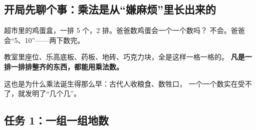 \subsection{开局先聊个事：乘法是从“嫌麻烦”里长出来的}

超市里的鸡蛋盒，一排 5 个，2 排。爸爸数鸡蛋会一个一个数吗？
不会。爸爸会“5、10”——两下数完。

教室里座位、乐高底板、药板、地砖、巧克力块，全是这样一格一格的。
\textbf{凡是一排一排排整齐的东西，都能用乘法数。}

这也是为什么乘法诞生得那么早：古代人收粮食、数牲口，
一个一个数实在受不了，就发明了“几个几”。

\subsection{任务 1：一组一组地数}

